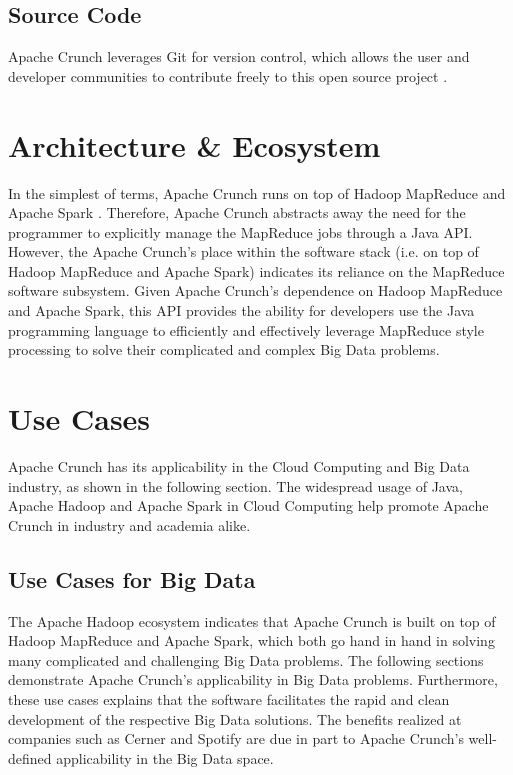 \documentclass[9pt,twocolumn,twoside]{../../styles/osajnl}
\begin{document}
\subsection{Source Code}\label{source}
Apache Crunch leverages Git for version control, which allows the user
and developer communities to contribute freely to this open source
project \cite{www-crunch-git, www-github}.

\section{Architecture \& Ecosystem} \label{ecosystem}
In the simplest of terms, Apache Crunch runs on top of Hadoop
MapReduce and Apache Spark \cite{www-crunch-api}. Therefore, Apache
Crunch abstracts away the need for the programmer to explicitly manage
the MapReduce jobs through a Java API. However, the Apache Crunch's
place within the software stack (i.e. on top of Hadoop MapReduce and
Apache Spark) indicates its reliance on the MapReduce software
subsystem. Given Apache Crunch's dependence on Hadoop MapReduce and
Apache Spark, this API provides the ability for developers use the
Java programming language to efficiently and effectively leverage
MapReduce style processing to solve their complicated and complex Big
Data problems.

\section{Use Cases} \label{use}
Apache Crunch has its applicability in the Cloud Computing and Big
Data industry, as shown in the following section. The widespread usage
of Java, Apache Hadoop and Apache Spark in Cloud Computing help
promote Apache Crunch in industry and academia alike.

\subsection{Use Cases for Big Data} \label{big}
The Apache Hadoop ecosystem indicates that Apache Crunch is built on
top of Hadoop MapReduce and Apache Spark, which both go hand in hand
in solving many complicated and challenging Big Data problems. The
following sections demonstrate Apache Crunch's applicability in Big
Data problems. Furthermore, these use cases explains that the software
facilitates the rapid and clean development of the respective Big Data
solutions. The benefits realized at companies such as Cerner and
Spotify are due in part to Apache Crunch's well-defined applicability
in the Big Data space.
\end{document}
